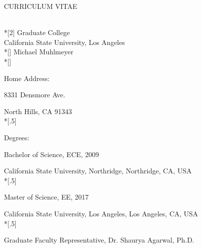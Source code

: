 \begin{spacing}{1} %
\thispagestyle{plain} %
\begin{center}
CURRICULUM VITAE\\*[2\baselineskip]%
 Graduate College \\
 California State University, Los Angeles \\*[\baselineskip]
 Michael Muhlmeyer\\*[\baselineskip]
\end{center}


\noindent Home Address:

 8331 Densmore Ave.

 North Hills, CA 91343\\*[.5\baselineskip]

\noindent Degrees:

 Bachelor of Science, ECE, 2009

 California State University, Northridge, Northridge, CA, USA\\*[.5\baselineskip]

 Master of Science, EE, 2017

 California State University, Los Angeles, Los Angeles, CA, USA\\*[.5\baselineskip]






 


 Graduate Faculty Representative, Dr. Shaurya Agarwal,  Ph.D.

\end{spacing}
